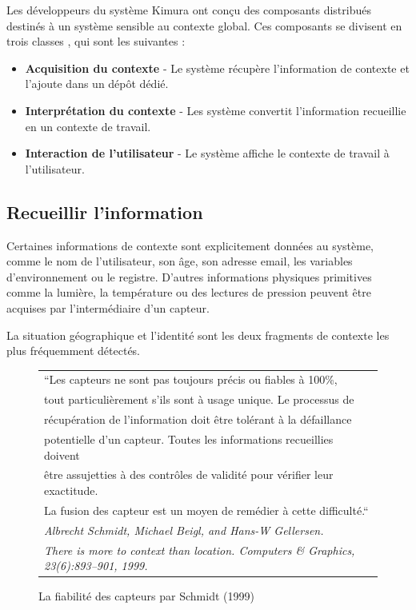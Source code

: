 Les développeurs du système Kimura ont conçu des composants distribués destinés
à un système sensible au contexte global. Ces composants se divisent en trois
classes \cite{voida_integrating_2002}, qui sont les suivantes :

\begin{itemize}
    \item \textbf{Acquisition du contexte} - Le système récupère l'information de
        contexte et l'ajoute dans un dépôt dédié.
    \item \textbf{Interprétation du contexte} - Les système convertit
        l'information recueillie en un contexte de travail.
    \item \textbf{Interaction de l'utilisateur} - Le système affiche le contexte
        de travail à l'utilisateur.
\end{itemize}

\subsection{Recueillir l'information}

Certaines informations de contexte sont explicitement données au système, comme
le nom de l'utilisateur, son âge, son adresse email, les variables
d'environnement ou le registre. D'autres informations physiques primitives comme
la lumière, la température ou des lectures de pression peuvent être acquises par
l'intermédiaire d'un capteur.

La situation géographique et l'identité sont les deux fragments de contexte les
plus fréquemment détectés.

\begin{figure}[H]
  \centering
  \begin{tabular}{l}
    ``Les capteurs ne sont pas toujours précis ou fiables à 100\%, \\
    tout particulièrement s'ils sont à usage unique. Le processus de \\
    récupération de l'information doit être tolérant à la défaillance \\
    potentielle d'un capteur. Toutes les informations recueillies doivent \\
    être assujetties à des contrôles de validité pour vérifier leur exactitude.\\
    La fusion des capteur est un moyen de remédier à cette difficulté.``
    \cite{schmidt_there_1999} \\
    \em \footnotesize Albrecht Schmidt, Michael Beigl, and Hans-W Gellersen. \\
    \em \footnotesize There is more to context than location. Computers \&
    Graphics, 23(6):893–901, 1999.
  \end{tabular}
  \caption{La fiabilité des capteurs par Schmidt (1999)}
  \label{fig:quote}
\end{figure}

